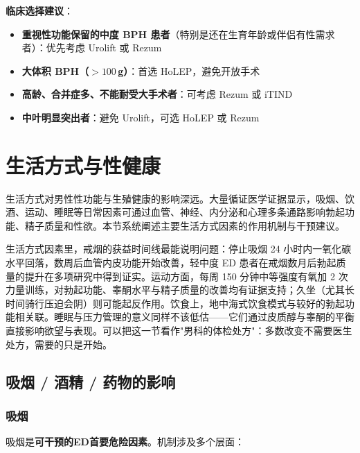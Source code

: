 \noindent\textbf{临床选择建议}：
\begin{itemize}[leftmargin=2cm]
	\item \textbf{重视性功能保留的中度 BPH 患者}（特别是还在生育年龄或伴侣有性需求者）：优先考虑 Urolift 或 Rezum
	\item \textbf{大体积 BPH（$>100$\,g）}：首选 HoLEP，避免开放手术
	\item \textbf{高龄、合并症多、不能耐受大手术者}：可考虑 Rezum 或 iTIND
	\item \textbf{中叶明显突出者}：避免 Urolift，可选 HoLEP 或 Rezum
\end{itemize}

\section{生活方式与性健康}

生活方式对男性性功能与生殖健康的影响深远。大量循证医学证据显示，吸烟、饮酒、运动、睡眠等日常因素可通过血管、神经、内分泌和心理多条通路影响勃起功能、精子质量和性欲。本节系统阐述主要生活方式因素的作用机制与干预建议。


生活方式因素里，戒烟的获益时间线最能说明问题：停止吸烟 24 小时内一氧化碳水平回落，数周后血管内皮功能开始改善，轻中度 ED 患者在戒烟数月后勃起质量的提升在多项研究中得到证实。运动方面，每周 150 分钟中等强度有氧加 2 次力量训练，对勃起功能、睾酮水平与精子质量的改善均有证据支持；久坐（尤其长时间骑行压迫会阴）则可能起反作用。饮食上，地中海式饮食模式与较好的勃起功能相关联。睡眠与压力管理的意义同样不该低估——它们通过皮质醇与睾酮的平衡直接影响欲望与表现。可以把这一节看作"男科的体检处方"：多数改变不需要医生处方，需要的只是开始。

\subsection{吸烟 / 酒精 / 药物的影响}

\subsubsection{吸烟}

吸烟是\textbf{可干预的ED首要危险因素}。机制涉及多个层面：

